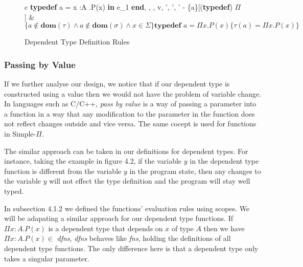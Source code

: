 \documentclass[a4paper,12pt]{report}
\begin{document}
\begin{figure}[H]
  \begin{center}
    \begin{tabular}{c}
      {\langle \textbf{typedef } a = \Pi x :A .P(x) \textbf{ in }e_1\textbf{ end}, 
      \sigma, \Sigma, \tau \rangle \longrightarrow 
        \langle v, \sigma', \Sigma', \tau' - \{a\}\rangle}[(\textbf{typedef}) $\Pi$] \text{ }    
      & \\
      $\{a \notin \textbf{dom}(\tau) \wedge a \notin \textbf{dom}(\sigma) \wedge x \in \Sigma\}\textbf{typedef }a = \Pi x. P(x)
        \{\tau(a) = \Pi x. P(x)\}$
    \end{tabular}
  \end{center}
  \caption{Dependent Type Definition Rules}
\end{figure}

\subsubsection{Passing by Value}

If we further analyse our design, we notice that if our dependent type is 
constructed using a value then we would not have the problem of variable change. 
In languages such as C/C++, \textit{pass by value} \cite{pbv} is a way of 
passing a parameter into a function in a way that any modification to the 
parameter in the function does not reflect changes outside and vice versa. The 
same cocept is used for functions in Simple-$\Pi$.

\par
The similar approach can be taken in our definitions for dependent types. For 
instance, taking the example in figure 4.2, if the variable $y$ in the dependent 
type function is different from the variable $y$ in the program state, then any 
changes to the variable $y$ will not effect the type definition and the program 
will stay well typed.
 
\par
In subsection 4.1.2 we defined the functions' evaluation rules using scopes. 
We will be adapating a similar approach for our dependent type functions. If 
$\Pi x : A. P(x)$ is a dependent type that depends on $x$ of type $A$ then we have  
$\Pi x : A.P(x) \in $ \textit{dfns}, \textit{dfns} behaves like \textit{fns}, 
holding the definitions of all dependent type functions. The only difference 
here is that a dependent type only takes a singular parameter. 
\end{document}
